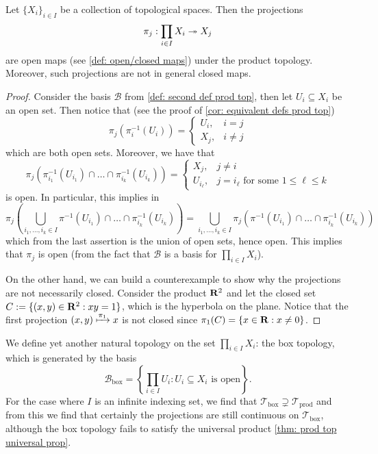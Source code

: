 \begin{lemma}
  Let \(\{X_i\}_{i \in I} \) be a collection of topological spaces. Then the
  projections
  \[
    \pi_j: \prod_{i \in I} X_i \twoheadrightarrow X_j
  \]
  are open maps (see \cref{def: open/closed maps}) under the product
  topology. Moreover, such projections are not in general closed maps.
\end{lemma}

\begin{proof}
  Consider the basis \(\mathcal B\) from \cref{def: second def prod top}, then
  let \(U_i \subseteq X_i\) be an open set. Then notice that (see the proof of
  \cref{cor: equivalent defs prod top})
  \[
    \pi_j(\pi_i^{-1}(U_i)) =
    \begin{cases}
      U_i, &i = j \\
      X_j, &i \neq j
    \end{cases}
  \]
  which are both open sets. Moreover, we have that
  \[
    \pi_j \left(\pi_{i_1}^{-1}(U_{i_1}) \cap \dots \cap \pi_{i_k}^{-1}(U_{i_k})
    \right) =
    \begin{cases}
      X_j,        & j \neq i \\
      U_{i_\ell}, & j = i_\ell \text{ for some } 1 \leq \ell \leq k
    \end{cases}
  \]
  is open. In particular, this implies in
  \[
    \pi_j \left( \bigcup_{i_1, \dots, i_k \in I} \pi^{-1}(U_{i_1}) \cap \dots
    \cap \pi_{i_k}^{-1}(U_{i_k}) \right)
    =
    \bigcup_{i_1, \dots, i_k \in I} \pi_j \left( \pi^{-1}(U_{i_1}) \cap \dots
    \cap \pi_{i_k}^{-1}(U_{i_k}) \right)
  \]
  which from the last assertion is the union of open sets, hence open. This
  implies that \(\pi_j\) is open (from the fact that \(\mathcal B\) is a basis
  for \(\prod_{i \in I} X_i\)).

  On the other hand, we can build a counterexample to show why the projections
  are not necessarily closed. Consider the product \(\mathbf{R}^2\) and let the
  closed set \(C := \{(x, y) \in \mathbf{R}^2 : x y = 1\}\), which is the
  hyperbola on the plane. Notice that the first projection \((x, y)
  \xmapsto{\pi_1} x\) is not closed since \(\pi_1(C) = \{x \in \mathbf{R} : x
  \neq 0\}\).
\end{proof}

\begin{definition}
  We define yet another natural topology on the set \(\prod_{i \in I} X_i\): the
  box topology, which is generated by the basis
  \[
    \mathcal B_\text{box} = \left\{\prod_{i \in I} U_i : U_i \subseteq X_i
    \text{ is open}\right\}.
  \]
  For the case where \(I\) is an infinite indexing set, we find that \(\mathcal
  T_\text{box} \supsetneq \mathcal T_\text{prod}\) and from this we find that
  certainly the projections are still continuous on \(\mathcal T_\text{box}\),
  although the box topology fails to satisfy the universal product \cref{thm:
  prod top universal prop}.
\end{definition}

